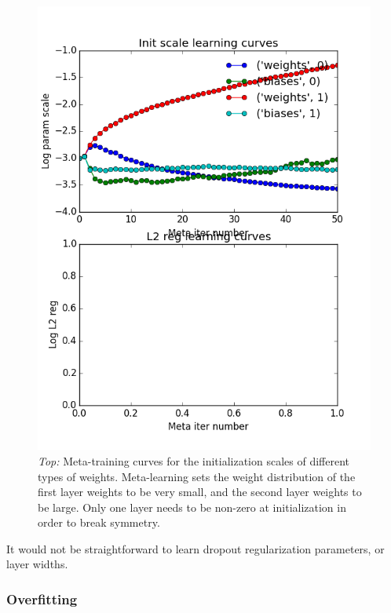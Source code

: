 \documentclass{article}
\begin{document}
\begin{figure}[h!]
\vskip 0.2in
\begin{center}
\centerline{\includegraphics[width=\columnwidth]{../experiments/Jan_28_training_schedule/4_training_loss_nn/scale_and_reg.png}}
\caption{\emph{Top:} Meta-training curves for the initialization scales of different types of weights.
Meta-learning sets the weight distribution of the first layer weights to be very small, and the second layer weights to be large.
Only one layer needs to be non-zero at initialization in order to break symmetry.}
\label{fig:nn meta-learning curves}
\end{center}
\vskip -0.2in
\end{figure} 

It would not be straightforward to learn dropout regularization parameters, or layer widths.

\subsubsection{Overfitting}
\end{document}
